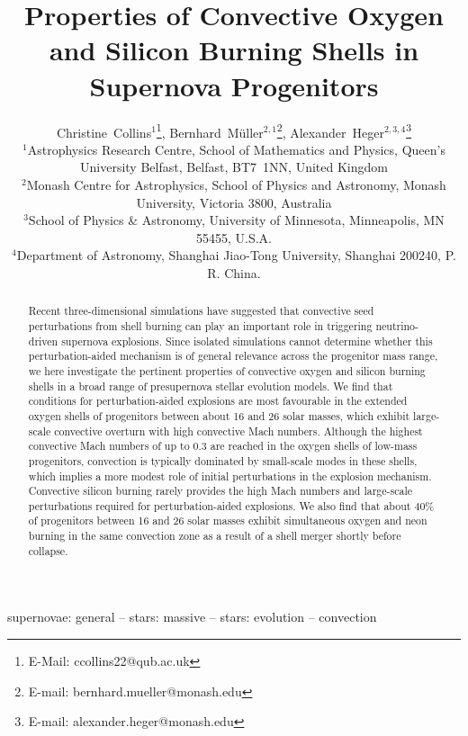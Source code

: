\documentclass[useAMS,usenatbib]{mnras}
\title{Properties of Convective Oxygen and Silicon Burning Shells in Supernova Progenitors}
\author[C.~Collins et al.]{
  Christine~Collins$^{1}$\thanks{E-Mail: ccollins22@qub.ac.uk},
  Bernhard~M\"uller$^{2,1}$\thanks{E-mail: bernhard.mueller@monash.edu},
  Alexander~Heger$^{2,3,4}$\thanks{E-mail: alexander.heger@monash.edu}
\\
$^1${Astrophysics Research Centre, School
  of Mathematics and Physics, Queen's University
  Belfast, Belfast, BT7~1NN, United Kingdom} \\
$^2${Monash Centre for Astrophysics, School of
  Physics and Astronomy, Monash University, Victoria
  3800, Australia} \\
$^3${School of Physics \& Astronomy,
  University of Minnesota, Minneapolis, MN 55455, U.S.A.} \\
$^4${Department of   Astronomy, Shanghai Jiao-Tong University, Shanghai
  200240, P. R. China.} \\
}
\begin{document}
\label{firstpage}
\pagerange{\pageref{firstpage}--\pageref{lastpage}}

\maketitle

\begin{abstract}
Recent three-dimensional simulations have suggested that convective
seed perturbations from shell burning can play an important role in
triggering neutrino-driven supernova explosions. Since isolated
simulations cannot determine whether this perturbation-aided mechanism
is of general relevance across the progenitor mass range, we here
investigate the pertinent properties of convective oxygen and silicon
burning shells in a broad range of presupernova stellar evolution
models. We find that conditions for perturbation-aided explosions are
most favourable in the extended oxygen shells of progenitors between
about 16 and 26 solar masses, which exhibit large-scale convective
overturn with high convective Mach numbers. Although the highest
convective Mach numbers of up to 0.3 are reached in the oxygen shells
of low-mass progenitors, convection is typically dominated by
small-scale modes in these shells, which implies a more modest role of
initial perturbations in the explosion mechanism.  Convective silicon
burning rarely provides the high Mach numbers and large-scale
perturbations required for perturbation-aided explosions.  We also
find that about $40\%$ of progenitors between 16 and 26 solar masses
exhibit simultaneous oxygen and neon burning in the same convection
zone as a result of a shell merger shortly before collapse.
\end{abstract}

\begin{keywords}
  supernovae: general -- stars: massive -- stars: evolution -- convection
\end{keywords}
\end{document}
